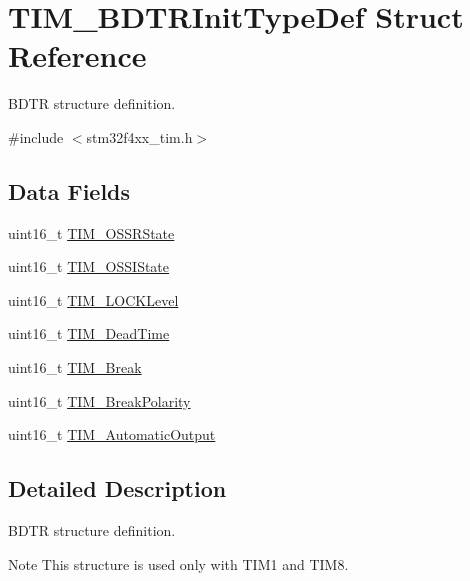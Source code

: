 \hypertarget{struct_t_i_m___b_d_t_r_init_type_def}{\section{T\-I\-M\-\_\-\-B\-D\-T\-R\-Init\-Type\-Def Struct Reference}
\label{struct_t_i_m___b_d_t_r_init_type_def}
}


B\-D\-T\-R structure definition.  




{\ttfamily \#include $<$stm32f4xx\-\_\-tim.\-h$>$}

\subsection*{Data Fields}
\begin{DoxyCompactItemize}
\item 
uint16\-\_\-t \hyperlink{struct_t_i_m___b_d_t_r_init_type_def_a5d0ca05d766b82cde0a56a6b61c02f8b}{T\-I\-M\-\_\-\-O\-S\-S\-R\-State}
\item 
uint16\-\_\-t \hyperlink{struct_t_i_m___b_d_t_r_init_type_def_afc160a2e65a93ea65c81bf05aa6f085d}{T\-I\-M\-\_\-\-O\-S\-S\-I\-State}
\item 
uint16\-\_\-t \hyperlink{struct_t_i_m___b_d_t_r_init_type_def_acba399df603976d328261af5cd9ae011}{T\-I\-M\-\_\-\-L\-O\-C\-K\-Level}
\item 
uint16\-\_\-t \hyperlink{struct_t_i_m___b_d_t_r_init_type_def_a136119743510d706b94e605f86b31f82}{T\-I\-M\-\_\-\-Dead\-Time}
\item 
uint16\-\_\-t \hyperlink{struct_t_i_m___b_d_t_r_init_type_def_a7f141e06bab7928bc0b8327f0d20e664}{T\-I\-M\-\_\-\-Break}
\item 
uint16\-\_\-t \hyperlink{struct_t_i_m___b_d_t_r_init_type_def_a71f25c4b4d7207152436dd716a6cb2f1}{T\-I\-M\-\_\-\-Break\-Polarity}
\item 
uint16\-\_\-t \hyperlink{struct_t_i_m___b_d_t_r_init_type_def_a85ef0b5598749ffd67dd360e615bcf9a}{T\-I\-M\-\_\-\-Automatic\-Output}
\end{DoxyCompactItemize}


\subsection{Detailed Description}
B\-D\-T\-R structure definition. 

\begin{DoxyNote}{Note}
This structure is used only with T\-I\-M1 and T\-I\-M8. 
\end{DoxyNote}


